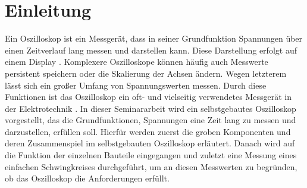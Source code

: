 \section{Einleitung}

Ein Oszilloskop ist ein Messgerät, dass in seiner Grundfunktion Spannungen
über einen Zeitverlauf lang messen und darstellen kann.
Diese Darstellung erfolgt auf einem Display \cite{KnowUrOscilloscope}.
Komplexere Oszilloskope können häufig auch Messwerte persistent speichern oder die Skalierung der Achsen
ändern. Wegen letzterem lässt sich ein großer Umfang von Spannungswerten messen.
Durch diese Funktionen ist das Oszilloskop ein oft- und vielseitig verwendetes Messgerät
in der Elektrotechnik \cite{ETechnikEinfach}. \newline \newline
In dieser Seminararbeit wird ein selbstgebautes Oszilloskop vorgestellt, das die Grundfunktionen,
Spannungen eine Zeit lang zu messen und darzustellen, erfüllen soll. \newline
Hierfür werden zuerst die groben Komponenten und deren Zusammenspiel im selbstgebauten Oszilloskop erläutert.
Danach wird auf die Funktion der einzelnen Bauteile eingegangen und
zuletzt eine Messung eines einfachen Schwingkreises durchgeführt, um an diesen Messwerten zu begründen,
ob das Oszilloskop die Anforderungen erfüllt.  
